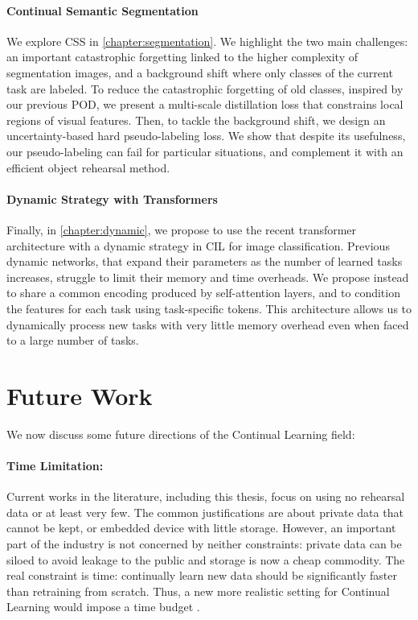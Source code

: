 \paragraph{Continual Semantic Segmentation} We explore \ac{CSS} in \autoref{chapter:segmentation}.
We highlight the two main challenges: an important catastrophic forgetting linked to the higher
complexity of segmentation images, and a background shift where only classes of the current task are
labeled. To reduce the catastrophic forgetting of old classes, inspired by our previous POD, we
present a multi-scale distillation loss that constrains local regions of visual features. Then, to
tackle the background shift, we design an uncertainty-based hard pseudo-labeling loss. We show that
despite its usefulness, our pseudo-labeling can fail for particular situations, and complement it
with an efficient object rehearsal method.

\paragraph{Dynamic Strategy with Transformers} Finally, in \autoref{chapter:dynamic}, we propose to
use the recent transformer architecture with a dynamic strategy in \acf{CIL} for image
classification. Previous dynamic networks, that expand their parameters as the number of learned
tasks increases, struggle to limit their memory and time overheads. We propose instead to share a
common encoding produced by self-attention layers, and to condition the features for each task using
task-specific tokens. This architecture allows us to dynamically process new tasks with very little
memory overhead even when faced to a large number of tasks.

\section{Future Work}

We now discuss some future directions of the Continual Learning field:

\paragraph{Time Limitation:} Current works in the literature, including this thesis, focus on using
no rehearsal data or at least very few. The common justifications are about private data that cannot
be kept, or embedded device with little storage. However, an important part of the industry is not
concerned by neither constraints: private data can be siloed to avoid leakage to the public and
storage is now a cheap commodity. The real constraint is time: continually learn new data should be
significantly faster than retraining from scratch. Thus, a new more realistic setting for Continual
Learning would impose a time budget \citep{veniat2018budgetedlearning}.

